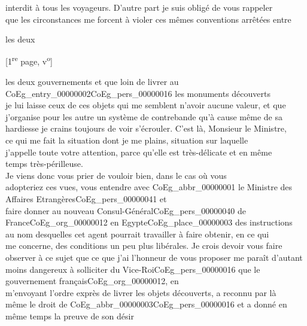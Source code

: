 \documentclass{book}
\begin{document}
interdit à tous les voyageurs. D’autre part je suis obligé de vous rappeler\\
que les circonstances me forcent à violer ces mêmes conventions arrêtées entre\\
\begin{flushright}les deux\end{flushright}
 {\footnotesize \begin{center} {[1\textsuperscript{re} page, v\textsuperscript{o}]}\end{center}}
les deux gouvernements et que loin de livrer au \gls{CoEg_entry_00000002}\gls{CoEg_pers_00000016} les monuments découverts\\
je lui laisse ceux de ces objets qui me semblent n’avoir aucune valeur, et que\\
j’organise pour les autre un système de contrebande qu’à cause même de sa\\
hardiesse je crains toujours de voir s’écrouler. C’est là, Monsieur le Ministre,\\
ce qui me fait la situation dont je me plains, situation sur laquelle\\
j’appelle toute votre attention, parce qu’elle est très-délicate et en même\\
temps très-périlleuse.\\
\indent Je viens donc vous prier de vouloir bien, dans le cas où vous\\
adopteriez ces vues, vous entendre avec \gls{CoEg_abbr_00000001} le Ministre des Affaires Etrangères\gls{CoEg_pers_00000041} et\\
faire donner au nouveau Consul-Général\gls{CoEg_pers_00000040} de France\gls{CoEg_org_00000012} en Egypte\gls{CoEg_place_00000003} des instructions\\
au nom desquelles cet agent pourrait travailler à faire obtenir, en ce qui\\
me concerne, des conditions un peu plus libérales. Je crois devoir vous faire\\
observer à ce sujet que ce que j’ai l’honneur de vous proposer me paraît d’autant\\
moins dangereux à solliciter du Vice-Roi\gls{CoEg_pers_00000016} que le gouvernement français\gls{CoEg_org_00000012}, en\\
m’envoyant l’ordre exprès de livrer les objets découverts, a reconnu par là\\
même le droit de \gls{CoEg_abbr_00000003}\gls{CoEg_pers_00000016} et a donné en même temps la preuve de son désir\\
\end{document}
